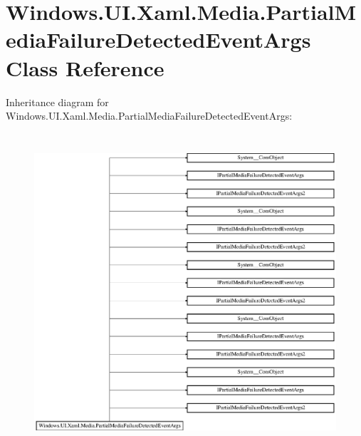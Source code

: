 \hypertarget{class_windows_1_1_u_i_1_1_xaml_1_1_media_1_1_partial_media_failure_detected_event_args}{}\section{Windows.\+U\+I.\+Xaml.\+Media.\+Partial\+Media\+Failure\+Detected\+Event\+Args Class Reference}
\label{class_windows_1_1_u_i_1_1_xaml_1_1_media_1_1_partial_media_failure_detected_event_args}
Inheritance diagram for Windows.\+U\+I.\+Xaml.\+Media.\+Partial\+Media\+Failure\+Detected\+Event\+Args\+:\begin{figure}[H]
\begin{center}
\leavevmode
\includegraphics[height=11.789474cm]{class_windows_1_1_u_i_1_1_xaml_1_1_media_1_1_partial_media_failure_detected_event_args}
\end{center}
\end{figure}
